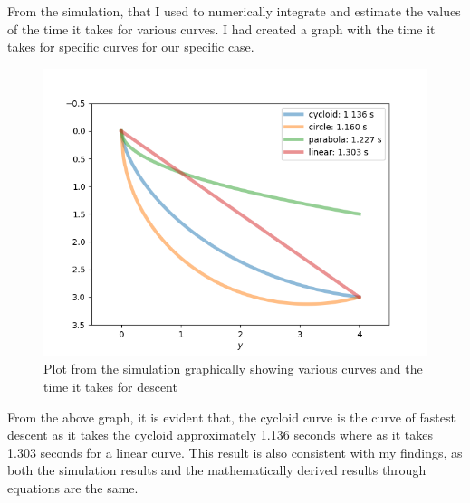 {From the simulation, that I used to numerically integrate and estimate the values of the time it takes for various curves. I had created a graph with the time it takes for specific curves for our specific case.}

\begin{figure}[H]
\centering
\includegraphics[width=15cm]{BrachDia.png}
    		\caption{{Plot from the simulation graphically showing various curves and the time it takes for descent}}
\end{figure}

{From the above graph, it is evident that, the cycloid curve is the curve of fastest descent as it takes the cycloid approximately 1.136 seconds where as it takes 1.303 seconds for a linear curve. This result is also consistent with my findings, as both the simulation results and the mathematically derived results through equations are the same.}


